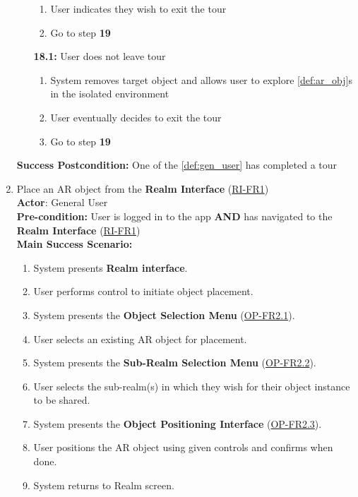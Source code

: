 \documentclass{article}
\begin{document}
\begin{enumerate}[label=\textbf{UC\arabic*}]
\begin{itemize}
            \begin{enumerate}[label=\textbf{\arabic*.}]
                \item User indicates they wish to exit the tour
                \item Go to step \textbf{19}
            \end{enumerate}
            \item[{\bf 18.1:}] User does not leave tour
            \begin{enumerate}[label=\textbf{\arabic*.}]
                \item System removes target object and allows user to explore \ref{def:ar_obj}s in the isolated environment
                \item User eventually decides to exit the tour
                \item Go to step \textbf{19}
            \end{enumerate}
        \end{itemize}
        \textbf{Success Postcondition:} One of the \ref{def:gen_user} has completed a tour
    
    \item \label{uc:7} Place an AR object from the \textbf{Realm Interface} (\hyperref[ssub:realm_interface]{RI-FR1}) \\ 
        \textbf{Actor}: General User \\ 
        \textbf{Pre-condition:} User is logged in to the app \textbf{AND} has navigated to the \textbf{Realm Interface} (\hyperref[ssub:realm_interface]{RI-FR1}) \\
    
        \textbf{Main Success Scenario:}
        \begin{enumerate}[label=\textbf{\arabic*.}]
            \item System presents \textbf{Realm interface}.
            \item User performs control to initiate object placement.
            \item System presents the \textbf{Object Selection Menu} (\hyperref[ssub:object_placement]{OP-FR2.1}).
            \item User selects an existing AR object for placement.
            \item System presents the \textbf{Sub-Realm Selection Menu} (\hyperref[ssub:object_placement]{OP-FR2.2}).
            \item User selects the sub-realm(s) in which they wish for their object instance to be shared.
            \item System presents the \textbf{Object Positioning Interface} (\hyperref[ssub:object_placement]{OP-FR2.3}). 
            \item User positions the AR object using given controls and confirms when done.
            \item System returns to Realm screen.
        \end{enumerate}
    

\end{enumerate}
\end{document}
